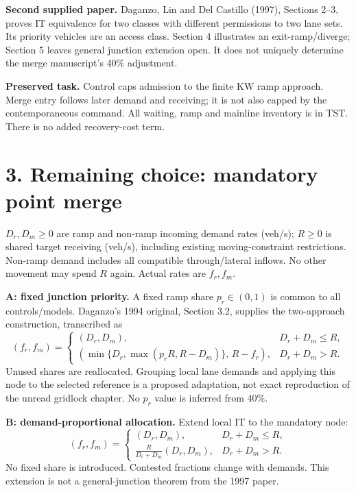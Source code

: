 \documentclass[11pt,a4paper]{article}
\begin{document}
\textbf{Second supplied paper.} Daganzo, Lin and Del Castillo (1997),
Sections 2--3, proves IT equivalence for two classes with different permissions
to two lane sets. Its priority vehicles are an access class. Section 4
illustrates an exit-ramp/diverge; Section 5 leaves general junction extension
open. It does not uniquely determine the merge manuscript's 40\% adjustment.

\textbf{Preserved task.} Control caps admission to the finite KW ramp approach.
Merge entry follows later demand and receiving; it is not also capped by the
contemporaneous command. All waiting, ramp and mainline inventory is in TST.
There is no added recovery-cost term.

\newpage
\section*{3. Remaining choice: mandatory point merge}
$D_r,D_m\ge0$ are ramp and non-ramp incoming demand rates (veh/s);
$R\ge0$ is shared target receiving (veh/s), including existing moving-constraint
restrictions. Non-ramp demand includes all compatible through/lateral inflows.
No other movement may spend $R$ again. Actual rates are $f_r,f_m$.

\textbf{A: fixed junction priority.} A fixed ramp share $p_r\in(0,1)$ is
common to all controls/models. Daganzo's 1994 original, Section 3.2, supplies
the two-approach construction, transcribed as
\begin{equation}
(f_r,f_m)=
\begin{cases}
(D_r,D_m),&D_r+D_m\le R,\\
\left(\min\{D_r,\max(p_rR,R-D_m)\},\,R-f_r\right),
&D_r+D_m>R.
\end{cases}
\end{equation}
Unused shares are reallocated. Grouping local lane demands and applying this
node to the selected reference is a proposed adaptation, not exact reproduction
of the unread gridlock chapter. No $p_r$ value is inferred from 40\%.

\textbf{B: demand-proportional allocation.} Extend local IT to the mandatory node:
\begin{equation}
(f_r,f_m)=
\begin{cases}
(D_r,D_m),&D_r+D_m\le R,\\
\displaystyle\frac{R}{D_r+D_m}(D_r,D_m),&D_r+D_m>R.
\end{cases}
\end{equation}
No fixed share is introduced. Contested fractions change with demands. This
extension is not a general-junction theorem from the 1997 paper.
\end{document}

